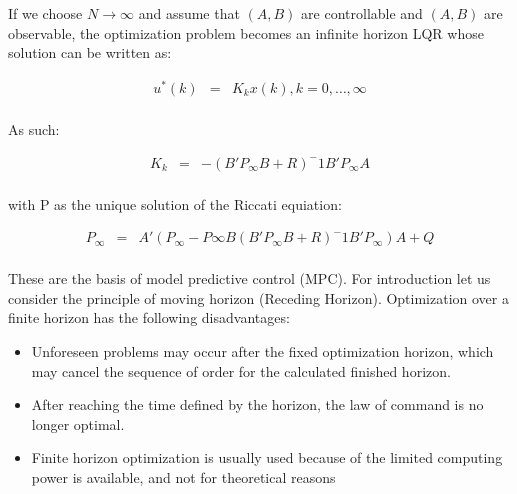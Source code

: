 		If we choose $N\longrightarrow\infty$ and assume that $(A,B)$ are controllable and $(A,B)$ are observable, the optimization problem becomes an infinite horizon LQR whose solution can be written as:
		
		\begin{equation}
        \begin{array}{rcl}
         u^*(k)&=&K_kx(k), k=0,\dots,\infty\\
        \end{array}
        \label{BASICMPC:equ:control_law_infinite}
    \end{equation}
		
		As such:
		
		\begin{equation}
        \begin{array}{rcl}
         K_k&=&-(B'P_\infty B+R)^-1B'P_\infty A\\
        \end{array}
        \label{BASICMPC:equ:control_coefficient_infinite}
    \end{equation}
		
		with P as the unique solution of the Riccati equiation:
		
		\begin{equation}
        \begin{array}{rcl}
				P_\infty&=&A'(P_\infty-P\infty B(B'P_\infty B+R)^-1B'P_\infty)A+Q\\
        \end{array}
        \label{BASICMPC:equ:Riccati_infinite}
    \end{equation}
		
		These are the basis of model predictive control (MPC). For introduction let us consider the principle of moving horizon (Receding Horizon). Optimization over a finite horizon has the following disadvantages:
		
		\begin{itemize}
			\item Unforeseen problems may occur after the fixed optimization horizon, which may cancel the sequence of order for the 		calculated finished horizon.
		\item After reaching the time defined by the horizon, the law of command is no longer optimal.
		\item Finite horizon optimization is usually used because of the limited computing power is available, and not for theoretical reasons 
		\end{itemize}
		

